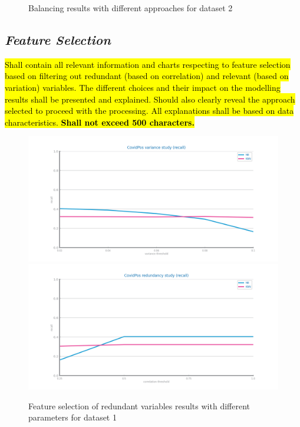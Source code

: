 \documentclass[10pt]{extarticle}
\newcommand{\ctext}[3][RGB]{%
  \begingroup
  \definecolor{hlcolor}{#1}{#2}\sethlcolor{hlcolor}%
  \hl{#3}%
  \endgroup
}
\begin{document}
\begin{figure}[H]
\caption{Balancing results with different approaches for dataset 2}
\end{figure}

\subsection*{\textit{Feature Selection}}
\ctext[RGB]{190,190,190}{Shall contain all relevant information and charts respecting to feature selection based on filtering out redundant (based on correlation) and relevant (based on variation) variables. The different choices and their impact on the modelling results shall be presented and explained. Should also clearly reveal the approach selected to proceed with the processing. All explanations shall be based on data characteristics.  \textbf{Shall not exceed 500 characters.}}

\begin{figure}[H]
\centering\includegraphics[scale=0.40]{images/dataset1/data_preparation/CovidPos_fs_low_var_recall_study.png}
\includegraphics[scale=0.40]{images/dataset1/data_preparation/CovidPos_fs_redundancy_recall_study.png}
\caption{Feature selection of redundant variables results with different parameters for dataset 1}
\end{figure}
\end{document}
